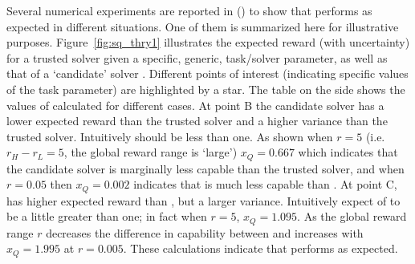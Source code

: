 Several numerical experiments are reported in \cite{Israelsen2018-qz} () to show that \xQ{} performs as expected in different situations. One of them is summarized here for illustrative purposes. Figure~\ref{fig:sq_thry1} illustrates the expected reward (with uncertainty) for a trusted solver \solvetrust{} given a specific, generic, task/solver parameter, as well as that of a `candidate' solver \solvecand. Different points of interest (indicating specific values of the task parameter) are highlighted by a star. The table on the side shows the values of \xQ{} calculated for different cases. At point B the candidate solver has a lower expected reward than the trusted solver and a higher variance than the trusted solver. Intuitively \xQ{} should be less than one. As shown when $r=5$ (i.e. $r_H-r_L=5$, the global reward range is `large') $x_Q=0.667$ which indicates that the candidate solver is marginally less capable than the trusted solver, and when $r=0.05$ then $x_Q=0.002$ indicates that \solvecand{} is much less capable than \solvetrust. At point C, \solvecand{} has higher expected reward than \solvetrust, but a larger variance. Intuitively expect \xQ{} of \solvecand{} to be a little greater than one; in fact when $r=5$, $x_Q=1.095$. As the global reward range $r$ decreases the difference in capability between \solvecand{} and \solvetrust{} increases with $x_Q=1.995$ at $r=0.005$. These calculations indicate that \xQ{} performs as expected.
